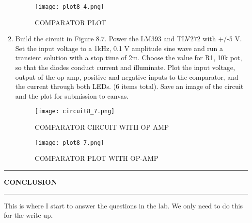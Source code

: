 \documentclass{article}
\begin{document}
\begin{enumerate}
    \begin{figure}[H]
        \centering
        \texttt{[image: plot8\_4.png]}
        \caption{COMPARATOR PLOT} 
        \label{fig:comp-plot}
    \end{figure}
    \item Build the circuit in Figure 8.7. Power the LM393 and TLV272 with +/-5 V.
Set the input voltage to a 1kHz, 0.1 V amplitude sine wave and run a transient
solution with a stop time of 2m. Choose the value for R1, 10k pot, so that
the diodes conduct current and illuminate. Plot the input voltage, output of
the op amp, positive and negative inputs to the comparator, and the current
through both LEDs. (6 items total). Save an image of the circuit and the plot
for submission to canvas.
    \begin{figure}[H]
        \centering
        \texttt{[image: circuit8\_7.png]}
        \caption{COMPARATOR CIRCUIT WITH OP-AMP} 
        \label{fig:comp-circuit-op-amp}
    \end{figure}

    \begin{figure}[H]
        \centering
        \texttt{[image: plot8\_7.png]}
        \caption{COMPARATOR PLOT WITH OP-AMP} 
        \label{fig:comp-plot-op-amp}
    \end{figure}
\end{enumerate}
\pagebreak
\begin{center}
    \hrule
    \vspace{0.2cm}
    \textbf{\large CONCLUSION}
    \vspace{0.2cm}
    \hrule
\end{center}

This is where I start to answer the questions in the lab. We only need to do this for the write up.
\end{document}

